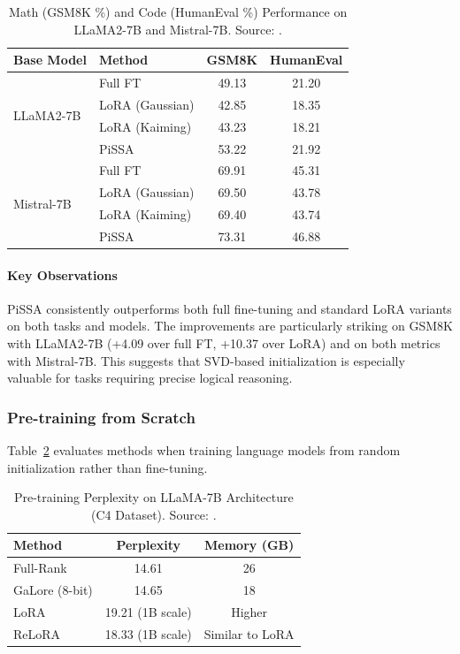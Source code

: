 \begin{table}[H]
  \centering
  \caption{Math (GSM8K \%) and Code (HumanEval \%) Performance on LLaMA2-7B and Mistral-7B. Source: \cite{meng2024pissa}.}
  \label{tab:math-code}
  \begin{tabular}{llcc}
    \toprule
    Base Model & Method & GSM8K & HumanEval \\
    \midrule
    \multirow{4}{*}{LLaMA2-7B} & Full FT & 49.13 & 21.20 \\
    & LoRA (Gaussian) & 42.85 & 18.35 \\
    & LoRA (Kaiming) & 43.23 & 18.21 \\
    & PiSSA & 53.22 & 21.92 \\
    \multirow{4}{*}{Mistral-7B} & Full FT & 69.91 & 45.31 \\
    & LoRA (Gaussian) & 69.50 & 43.78 \\
    & LoRA (Kaiming) & 69.40 & 43.74 \\
    & PiSSA & 73.31 & 46.88 \\
    \bottomrule
  \end{tabular}
\end{table}

\paragraph{Key Observations}
PiSSA consistently outperforms both full fine-tuning and standard LoRA variants on both tasks and models. The improvements are particularly striking on GSM8K with LLaMA2-7B (+4.09 over full FT, +10.37 over LoRA) and on both metrics with Mistral-7B. This suggests that SVD-based initialization is especially valuable for tasks requiring precise logical reasoning.

\subsubsection{Pre-training from Scratch}

Table~\ref{tab:pretrain-perplexity} evaluates methods when training language models from random initialization rather than fine-tuning.

\begin{table}[H]
  \centering
  \caption{Pre-training Perplexity on LLaMA-7B Architecture (C4 Dataset). Source: \cite{zhao2024galore}.}
  \label{tab:pretrain-perplexity}
  \begin{tabular}{lcc}
    \toprule
    Method & Perplexity & Memory (GB) \\
    \midrule
    Full-Rank & 14.61 & 26 \\
    GaLore (8-bit) & 14.65 & 18 \\
    LoRA & 19.21 (1B scale) & Higher \\
    ReLoRA & 18.33 (1B scale) & Similar to LoRA \\
    \bottomrule
  \end{tabular}
\end{table}

